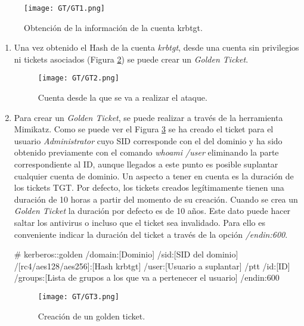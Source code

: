 \begin{figure}[H] %
\begin{center}
\texttt{[image: GT/GT1.png]}
\end{center}
\caption{Obtención de la información de la cuenta krbtgt.}
\label{GT1}
\end{figure}


\begin{enumerate}

\item Una vez obtenido el Hash de la cuenta {\it krbtgt}, desde una cuenta sin privilegios ni tickets asociados (Figura \ref{GT2}) se puede crear un {\it Golden Ticket}. 
\begin{figure}[H] %
\begin{center}
\texttt{[image: GT/GT2.png]}
\end{center}
\caption{Cuenta desde la que se va a realizar el ataque.}
\label{GT2}
\end{figure}

\item Para crear un {\it Golden Ticket}, se puede realizar a través de la herramienta Mimikatz. Como se puede ver el Figura \ref{GT3} se ha creado el ticket para el usuario {\it Administrator} cuyo SID corresponde con el del dominio y ha sido obtenido previamente con el comando {\it whoami /user} eliminando la parte correspondiente al ID, aunque llegados a este punto es posible suplantar cualquier cuenta de dominio. Un aspecto a tener en cuenta es la duración de los tickets TGT. Por defecto, los tickets creados le\-gí\-ti\-ma\-men\-te tienen una duración de 10 horas a partir del momento de su creación. Cuando se crea un {\it Golden Ticket} la duración por defecto es de 10 años. Este dato puede hacer saltar los antivirus o incluso que el ticket sea invalidado. Para ello es conveniente indicar la duración del ticket a través de la opción {\it /endin:600}. 

\begin{listing}[style=consola, numbers=none]
# kerberos::golden /domain:[Dominio] /sid:[SID del dominio] /[rc4/aes128/aes256]:[Hash krbtgt] /user:[Usuario a suplantar] /ptt /id:[ID] /groups:[Lista de grupos a los que va a pertenecer el usuario] /endin:600
\end{listing}

\begin{figure}[H] %
\begin{center}
\texttt{[image: GT/GT3.png]}
\end{center}
\caption{Creación de un golden ticket.}
\label{GT3}
\end{figure}


\end{enumerate}
